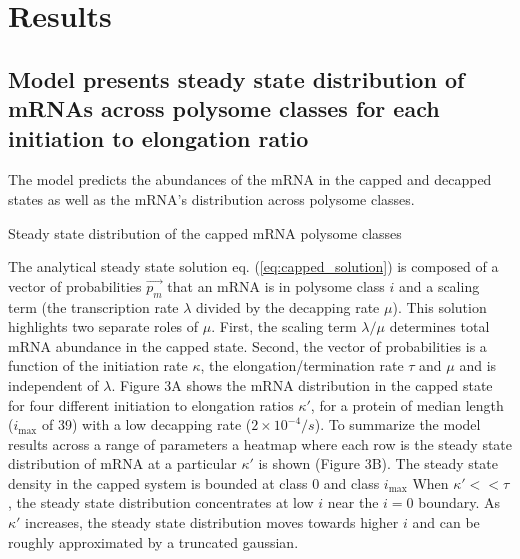 \documentclass[review]{elsarticle}
\newcommand{\imax}{\ensuremath{{i_{\max}}}\xspace}
\begin{document}


\section{Results}

\subsection{Model presents steady state distribution of mRNAs across polysome classes for each initiation to elongation ratio}

The model predicts the abundances of the mRNA in the capped and decapped states as well as the mRNA's distribution across polysome classes.

Steady state distribution of the capped mRNA polysome classes

The analytical steady state solution eq. (\ref{eq:capped_solution}) is composed of a vector of probabilities $\vec{p_m}$ that an mRNA is in polysome class $i$ and a scaling term (the transcription rate $\lambda$ divided by the decapping rate $\mu$). 
This solution highlights two separate roles of $\mu$. 
First, the scaling term $\lambda / \mu$ determines total mRNA abundance in the capped state. 
Second, the vector of probabilities is a function of the initiation rate $\kappa$, the elongation/termination rate $\tau$ and $\mu$ and is independent of $\lambda$.
Figure 3A shows the mRNA distribution in the capped state for four different initiation to elongation ratios $\kappa'$, for a protein of median length (\imax of 39) with a low decapping rate ($2\times10^{-4} /s$).
To summarize the model results across a range of parameters a heatmap where each row is the steady state distribution of mRNA at a particular $\kappa'$ is shown (Figure 3B).
The steady state density in the capped system is bounded at class 0 and class \imax 
When $\kappa'<<\tau$, the steady state distribution concentrates at low $i$ near the $i=0$ boundary.
As $\kappa'$ increases, the steady state distribution moves towards higher $i$ and can be roughly approximated by a truncated gaussian. 
\end{document}
